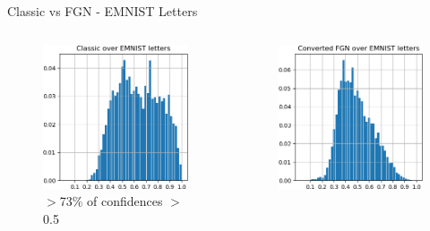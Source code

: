 \documentclass{beamer}
\begin{document}
\begin{frame}{Classic vs FGN - EMNIST Letters \cite{cohen2017emnist}}
 \vspace{-3mm}
    \begin{columns}
    \begin{column}{.33\textwidth}
    \begin{figure}
        \includegraphics[width=.85\textwidth]{images/Letters/hist-classic-letters.png}\\
        \centering \tiny{$>$73\% of confidences $>$0.5}
    \end{figure}
    \end{column}
    \begin{column}{.33\textwidth}
    \begin{figure}
        \includegraphics[width=.85\textwidth]{images/Letters/hist-converted-letters.png}\\

\end{figure}
\end{column}
\end{columns}
\end{frame}
\end{document}
